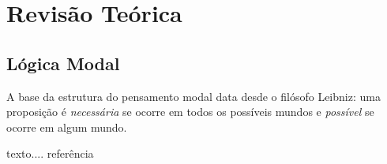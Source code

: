\chapter{Revisão Teórica}
\section{Lógica Modal}
\label{sec:l_gica_modal}

A base da estrutura do pensamento modal data desde o filósofo Leibniz: uma
proposição é \textit{necessária} se ocorre em todos os possíveis mundos 
e \textit{possível} se ocorre em algum mundo.







texto.... referência~\cite{chomsky57}








